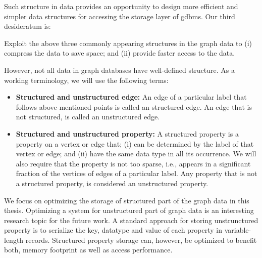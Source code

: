 \begin{guideline}
\begin{enumerate}
	\end{enumerate}
	
	Such structure in data provides an opportunity to design more efficient and simpler data structures for accessing the storage layer of \gls{gdbms}. Our third desideratum is:
	
	\begin{desideratum}
		Exploit the above three commonly appearing structures in the graph data to (i) compress the data to save space; and (ii) provide faster access to the data.
	\end{desideratum}
	
	\vspace{-10pt}
	However, not all data in graph databases have well-defined structure. As a working terminology, we will use the following terms:
	
	\begin{itemize}
		\item \textbf{Structured and unstructured edge:} An edge of a particular label that follows above-mentioned points is called an structured edge. An edge that is not structured, is called an unstructured edge.
		
		\item \textbf{Structured and unstructured property:} A structured property is a property on a vertex or edge that; (i) can be determined by the label of that vertex or edge; and (ii) have the same data type in all its occurrence. We will also require that the property is not too sparse, i.e., appears in a significant fraction of the vertices of edges of a particular label. Any property that is not a structured property, is considered an unstructured property.
		
	\end{itemize}
	
	We focus on optimizing the storage of structured part of the graph data in this thesis. Optimizing a system for unstructured part of graph data is an interesting research topic for the future work. A standard approach for storing unstrunctured property is to serialize the key, datatype and value of each property in variable-length records. Structured property storage can, however, be optimized to benefit both, memory footprint as well as access performance.
	
\end{guideline}


